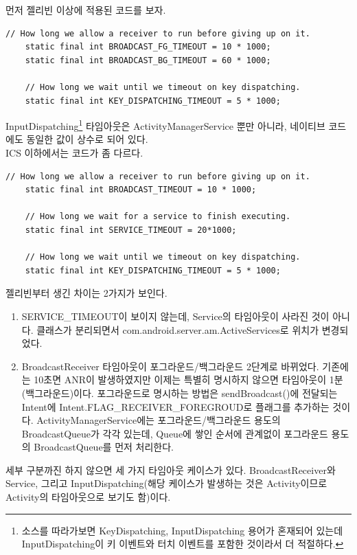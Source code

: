 먼저 젤리빈 이상에 적용된 코드를 보자.
\begin{lstlisting}[frame=single] 
	// How long we allow a receiver to run before giving up on it.
	static final int BROADCAST_FG_TIMEOUT = 10 * 1000;
	static final int BROADCAST_BG_TIMEOUT = 60 * 1000;

	// How long we wait until we timeout on key dispatching.
	static final int KEY_DISPATCHING_TIMEOUT = 5 * 1000;
\end{lstlisting}
InputDispatching\footnote{소스를 따라가보면 KeyDispatching, InputDispatching 용어가 혼재되어 있는데 InputDispatching이 키 이벤트와 터치 이벤트를 포함한 것이라서 더 적절하다.} 타임아웃은 ActivityManagerService 뿐만 아니라, 네이티브 코드에도 동일한 값이 상수로 되어 있다.\\

ICS 이하에서는 코드가 좀 다르다.
\begin{lstlisting}[frame=single] 
	// How long we allow a receiver to run before giving up on it.
	static final int BROADCAST_TIMEOUT = 10 * 1000;

	// How long we wait for a service to finish executing.
	static final int SERVICE_TIMEOUT = 20*1000;

	// How long we wait until we timeout on key dispatching.
	static final int KEY_DISPATCHING_TIMEOUT = 5 * 1000;
\end{lstlisting}

젤리빈부터 생긴 차이는 2가지가 보인다.
\begin{enumerate}
\item  SERVICE\_TIMEOUT이 보이지 않는데, Service의 타임아웃이 사라진 것이 아니다. 클래스가 분리되면서 com.android.server.am.ActiveServices로 위치가 변경되었다.
\item BroadcastReceiver 타임아웃이 포그라운드/백그라운드 2단계로 바뀌었다. 기존에는 10초면 ANR이 발생하였지만 이제는 특별히 명시하지 않으면 타임아웃이 1분(백그라운드)이다. 포그라운드로 명시하는 방법은 sendBroadcast()에 전달되는 Intent에 Intent.FLAG\_RECEIVER\_FOREGROUD로 플래그를 추가하는 것이다.
ActivityManagerService에는 포그라운드/백그라운드 용도의 BroadcastQueue가 각각 있는데, Queue에 쌓인 순서에 관계없이 포그라운드 용도의 BroadcastQueue를 먼저 처리한다.
\end{enumerate}

세부 구분까진 하지 않으면 세 가지 타임아웃 케이스가 있다. BroadcastReceiver와 Service, 그리고 InputDispatching(해당 케이스가 발생하는 것은 Activity이므로 Activity의 타임아웃으로 보기도 함)이다.\\

